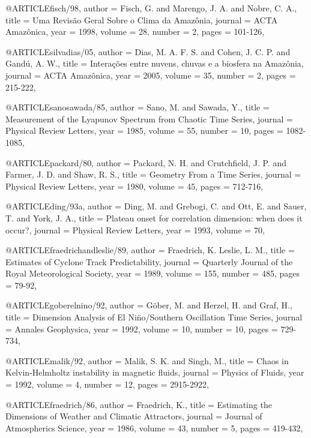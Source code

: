 @ARTICLE{fisch/98,
author 		= {Fisch, G. and Marengo, J. A. and Nobre, C. A.},
title		  = {Uma Revis\~ao Geral Sobre o Clima da Amaz\^onia},
journal 	= {ACTA Amaz\^onica},
year 			= {1998},
volume 		= {28},
number    = {2},
pages 		= {101-126},
}

@ARTICLE{silvadias/05,
author 		= {Dias, M. A. F. S. and Cohen, J. C. P. and Gand\'u, A. W.},
title		  = {Intera{\c c}\~oes entre nuvens, chuvas e a biosfera na Amaz\^onia},
journal 	= {ACTA Amaz\^onica},
year 			= {2005},
volume 		= {35},
number    = {2},
pages 		= {215-222},
}


@ARTICLE{sanosawada/85,
author 		= {Sano, M. and Sawada, Y.},
title		  = {Measurement of the Lyapunov Spectrum from Chaotic Time Series},
journal 	= {Physical Review Letters},
year 		  = {1985},
volume 		= {55},
number    = {10},
pages 		= {1082-1085},
}

@ARTICLE{packard/80,
author 		= {Packard, N. H. and Crutchfield, J. P. and Farmer, J. D. and Shaw, R. S.},
title		  = {Geometry From a Time Series},
journal 	= {Physical Review Letters},
year 	   	= {1980},
volume 		= {45},
pages 		= {712-716},
}

@ARTICLE{ding/93a,
author 		= {Ding, M. and Grebogi, C. and Ott, E. and Sauer, T. and York, J. A.},
title 		= {Plateau onset for correlation dimension: when does it occur?},
journal 	= {Physical Review Letters},
year 			= {1993},
volume 		= {70},
}


@ARTICLE{fraedrichandleslie/89,
author 		= {Fraedrich, K. Leslie, L. M.},
title		  = {Estimates of Cyclone Track Predictability},
journal 	= {Quarterly Journal of the Royal Meteorological Society},
year 	  	= {1989},
volume 		= {155},
number    = {485},
pages 		= {79-92},
}

@ARTICLE{goberelnino/92,
author 	= {G\"ober, M. and Herzel, H. and Graf, H.},
title		= {Dimension Analysis of El Ni\"no/Southern Oscillation Time Series},
journal = {Annales Geophysica},
year 		= {1992},
volume 	= {10},
number  = {10},
pages 	= {729-734},
}

@ARTICLE{malik/92,
author 		= {Malik, S. K. and Singh, M.},
title		  = {Chaos in Kelvin-Helmholtz instability in magnetic fluids},
journal 	= {Physics of Fluids},
year 		  = {1992},
volume 		= {4},
number    = {12},
pages 		= {2915-2922},
}

@ARTICLE{fraedrich/86,
author 		= {Fraedrich, K.},
title		  = {Estimating the Dimensions of Weather and Climatic Attractors},
journal 	= {Journal of Atmospherics Science},
year 	  	= {1986},
volume 		= {43},
number    = {5},
pages 		= {419-432},
}


